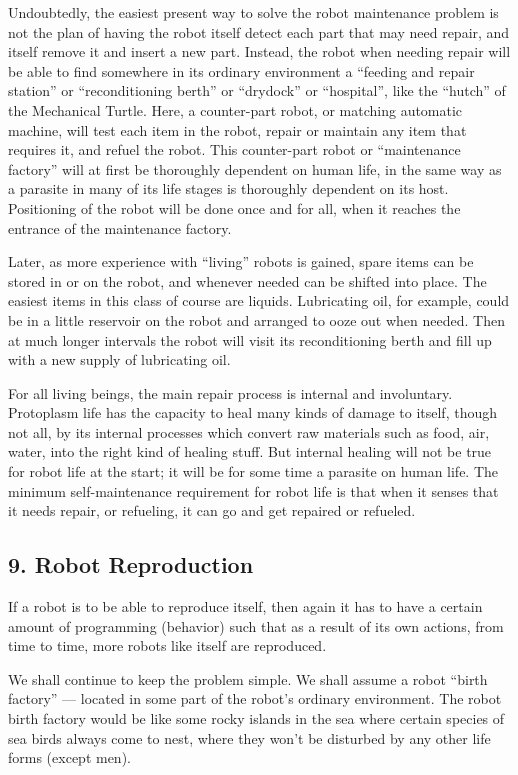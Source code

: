 \documentclass[11pt]{article}
\begin{document}
Undoubtedly, the easiest present way to solve the robot maintenance problem is
not the plan of having the robot itself detect each part that may need repair,
and itself remove it and insert a new part. Instead, the robot when needing
repair will be able to find somewhere in its ordinary environment a ``feeding
and repair station'' or ``reconditioning berth'' or ``drydock'' or
``hospital'', like the ``hutch'' of the Mechanical Turtle. Here, a counter-part
robot, or matching automatic machine, will test each item in the robot, repair
or maintain any item that requires it, and refuel the robot. This counter-part
robot or ``maintenance factory'' will at first be thoroughly dependent on human
life, in the same way as a parasite in many of its life stages is thoroughly
dependent on its host. Positioning of the robot will be done once and for all,
when it reaches the entrance of the maintenance factory.

Later, as more experience with ``living'' robots is gained, spare items can be
stored in or on the robot, and whenever needed can be shifted into place. The
easiest items in this class of course are liquids. Lubricating oil, for
example, could be in a little reservoir on the robot and arranged to ooze out
when needed. Then at much longer intervals the robot will visit its
reconditioning berth and fill up with a new supply of lubricating oil.

For all living beings, the main repair process is internal and involuntary.
Protoplasm life has the capacity to heal many kinds of damage to itself,
though not all, by its internal processes which convert raw materials such as
food, air, water, into the right kind of healing stuff. But internal healing
will not be true for robot life at the start; it will be for some time a
parasite on human life. The minimum self-maintenance requirement for robot life
is that when it senses that it needs repair, or refueling, it can go and get
repaired or refueled.

\subsection*{9. Robot Reproduction}

If a robot is to be able to reproduce itself, then again it has to have a
certain amount of programming (behavior) such that as a result of its own
actions, from time to time, more robots like itself are reproduced.

We shall continue to keep the problem simple. We shall assume a robot ``birth
factory'' --- located in some part of the robot's ordinary environment. The
robot birth factory would be like some rocky islands in the sea where certain
species of sea birds always come to nest, where they won't be disturbed by any
other life forms (except men).
\end{document}
